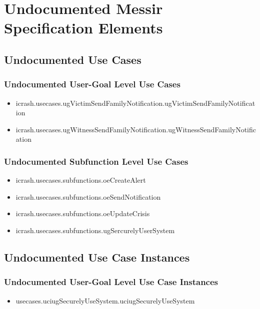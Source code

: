 	
\chapter{Undocumented Messir Specification Elements}


\section[Undocumented Use Cases]{Undocumented Use Cases}


\subsection[Undocumented Use Cases - User-Goal Level]{Undocumented User-Goal Level Use Cases}
\begin{itemize}
\item icrash.usecases.ugVictimSendFamilyNotification.ugVictimSendFamilyNotification 
\item icrash.usecases.ugWitnessSendFamilyNotification.ugWitnessSendFamilyNotification 
\end{itemize}

\subsection[Undocumented Use Cases - Subfunction Level]{Undocumented Subfunction Level Use Cases}
\begin{itemize}
\item icrash.usecases.subfunctions.oeCreateAlert 
\item icrash.usecases.subfunctions.oeSendNotification 
\item icrash.usecases.subfunctions.oeUpdateCrisis 
\item icrash.usecases.subfunctions.ugSercurelyUserSystem 
\end{itemize}





\section[Undocumented Use Case Instances]{Undocumented Use Case Instances}


\subsection[Undocumented Use Case Instances - User-Goal Level]{Undocumented User-Goal Level Use Case Instances}
\begin{itemize}
\item usecases.uciugSecurelyUseSystem.uciugSecurelyUseSystem 
\end{itemize}


